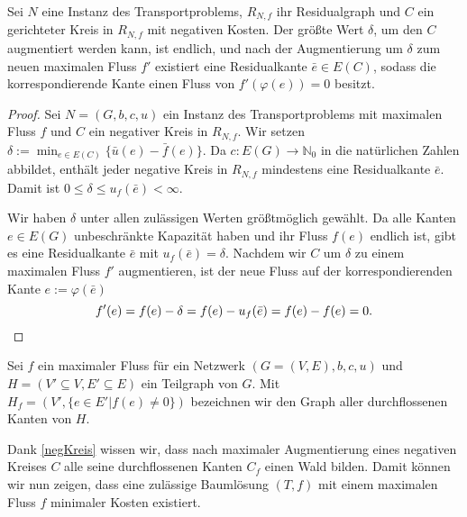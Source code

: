 \begin{lem}\label{negKreis}Sei $N$ eine Instanz des Transportproblems, $R_{N,f}$ ihr Residualgraph und $C$ ein gerichteter Kreis in $R_{N,f}$ mit negativen Kosten. Der größte Wert $\delta$, um den $C$ augmentiert werden kann, ist endlich, und nach der Augmentierung um $\delta$ zum neuen maximalen Fluss $f'$ existiert eine Residualkante $\bar{e}\in E(C)$, sodass die korrespondierende Kante einen Fluss von $f'(\varphi(e))=0$ besitzt. 
\end{lem}
\begin{proof}Sei $N=(G,b,c,u)$ ein Instanz des Transportproblems mit maximalen Fluss $f$ und $C$ ein negativer Kreis in $R_{N,f}$. Wir setzen $\delta:=\min_{e\in E(C)}\{\bar{u}(e)-\bar{f}(e)\}$. Da $c:E(G)\rightarrow\mathbb{N}_0$ in die natürlichen Zahlen abbildet, enthält jeder negative Kreis in $R_{N,f}$ mindestens eine Residualkante $\bar{e}$. Damit ist $0\leq\delta\leq u_f(\bar{e})<\infty$.

Wir haben $\delta$ unter allen zulässigen Werten größtmöglich gewählt. Da alle Kanten $e\in E(G)$ unbeschränkte Kapazität haben und ihr Fluss $f(e)$ endlich ist, gibt es eine Residualkante $\bar{e}$ mit $u_f(\bar{e})=\delta$. Nachdem wir $C$ um $\delta$ zu einem maximalen Fluss $f'$ augmentieren, ist der neue Fluss auf der korrespondierenden Kante $e:=\varphi(\bar{e})$
\begin{equation*}
f'(e)=f(e)-\delta=f(e)-u_f(\bar{e})=f(e)-f(e)=0.\qedhere
\end{equation*}\end{proof}

\begin{nota}Sei $f$ ein maximaler Fluss für ein Netzwerk $(G=(V,E),b,c,u)$ und $H=(V'\subseteq V, E'\subseteq E)$ ein Teilgraph von $G$. Mit $H_f=(V',\{e\in E' | f(e) \neq 0\})$ bezeichnen wir den Graph aller durchflossenen Kanten von $H$.\end{nota}

Dank \cref{negKreis} wissen wir, dass nach maximaler Augmentierung eines negativen Kreises $C$ alle seine durchflossenen Kanten $C_f$ einen Wald bilden. Damit können wir nun zeigen, dass eine zulässige Baumlösung $(T,f)$ mit einem maximalen Fluss $f$ minimaler Kosten existiert.

